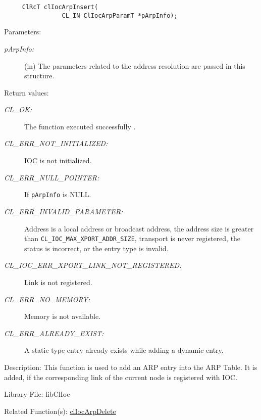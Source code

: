 \begin{flushleft}
\begin{Desc}
\footnotesize\begin{verbatim}     ClRcT clIocArpInsert(
                CL_IN ClIocArpParamT *pArpInfo);
\end{verbatim}
\normalsize
\end{Desc}
\begin{Desc}
\item[Parameters:]
\begin{description}
\item[{\em p\-Arp\-Info:}](in) The parameters related to the address resolution are passed in this structure.\end{description}
\end{Desc}
\begin{Desc}
\item[Return values:]
\begin{description}
\item[{\em CL\_\-OK:}]The function executed successfully . \item[{\em CL\_\-ERR\_\-NOT\_\-INITIALIZED:}] IOC is not initialized. 
\item[{\em CL\_\-ERR\_\-NULL\_\-POINTER:}]If {\tt{pArpInfo}} is NULL. 
\item[{\em CL\_\-ERR\_\-INVALID\_\-PARAMETER:}]Address is a local address or broadcast address, the address size is greater than
{\tt{CL\_\-IOC\_\-MAX\_\-XPORT\_\-ADDR\_\-SIZE}}, transport is never registered, the status is incorrect, or the entry type is invalid. 
\item[{\em CL\_\-IOC\_\-ERR\_\-XPORT\_\-LINK\_\-NOT\_\-REGISTERED:}]Link is not registered. 
\item[{\em CL\_\-ERR\_\-NO\_\-MEMORY:}]Memory is not available. 
\item[{\em CL\_\-ERR\_\-ALREADY\_\-EXIST:}]A static type entry already exists while adding a dynamic entry.\end{description}
\end{Desc}
\begin{Desc}
\item[Description:]This function is used to add an ARP entry into the ARP Table. It is added, if the corresponding link of the current node is registered 
with IOC.\end{Desc}
\begin{Desc}
\item[Library File:]libClIoc\end{Desc}
\begin{Desc}
\item[Related Function(s):]\hyperlink{pageioc209}{cl\-Ioc\-Arp\-Delete} \end{Desc}
\newpage



\end{flushleft}
